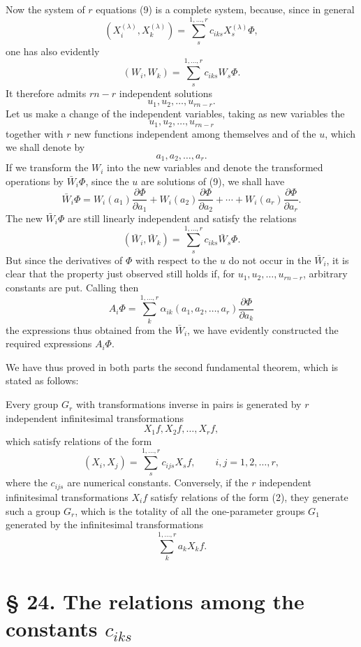 \documentclass[11pt]{book}
\begin{document}
Now the system of $r$ equations (9) is a complete system, because, since in general
\[
 (X_i^{(\lambda)},X_k^{(\lambda)})=\sum\limits_s^{1,\ldots,r}c_{iks}X_s^{(\lambda)}\Phi,
\]
one has also evidently
\[
 (W_i,W_k)=\sum\limits_s^{1,\ldots,r}c_{iks}W_s\Phi.
\]
It therefore admits $rn-r$ independent solutions
\[
 u_1,u_2,\ldots,u_{rn-r}.
\]
Let us make a change of the independent variables, taking as new variables the
\[
 u_1,u_2,\ldots,u_{rn-r}
\]
together with $r$ new functions independent among themselves and of the $u$, which we shall denote by
\[
 a_1,a_2,\ldots,a_r.
\]
If we transform the $W_i$ into the new variables and denote the transformed operations by $\bar W_i\Phi$, since the $u$ are solutions of (9), we shall have
\[
 \bar W_i\Phi=
 W_i(a_1)\frac{\partial\Phi}{\partial a_1}+
 W_i(a_2)\frac{\partial\Phi}{\partial a_2}+\cdots+
 W_i(a_r)\frac{\partial\Phi}{\partial a_r}.
\]
The new $\bar W_i\Phi$ are still linearly independent and satisfy the relations
\[
 (\bar W_i,\bar W_k)=\sum\limits_s^{1,\ldots,r}c_{iks}\bar W_s\Phi.
\]
But since the derivatives of $\Phi$ with respect to the $u$ do not occur in the $\bar W_i$, it is clear that the property just observed still holds if, for $u_1,u_2,\ldots,u_{rn-r}$, arbitrary constants are put. Calling then
\[
 A_i\Phi=\sum\limits_k^{1,\ldots,r}\alpha_{ik}(a_1,a_2,\ldots,a_r)\frac{\partial\Phi}{\partial a_k}
\]
the expressions thus obtained from the $\bar W_i$, we have evidently constructed the required expressions $A_i\Phi$.

We have thus proved in both parts the second fundamental theorem, which is stated as follows:

Every group $G_r$ with transformations inverse in pairs is generated by $r$ independent infinitesimal transformations
\[
 X_1f,
 X_2f,
 \ldots,
 X_rf,
\]
which satisfy relations of the form
\begin{equation*}\tag{2}
 (X_i,X_j)=\sum\limits_s^{1,\ldots,r} c_{ijs}X_s f,
 \qquad i,j=1,2,\ldots,r,
\end{equation*}
where the $c_{ijs}$ are numerical constants. Conversely, if the $r$ independent infinitesimal transformations $X_if$ satisfy relations of the form (2), they generate such a group $G_r$, which is the totality of all the one-parameter groups $G_1$ generated by the infinitesimal transformations
\[
 \sum\limits_k^{1,\ldots,r} a_kX_kf.
\]

\section*{\S{} 24. The relations among the constants $c_{iks}$}
\end{document}
